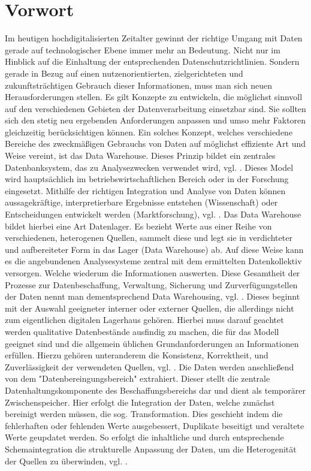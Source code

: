 \section{Vorwort}
Im heutigen hochdigitalisierten Zeitalter gewinnt der richtige Umgang mit Daten gerade auf technologischer Ebene immer mehr an Bedeutung. Nicht nur im Hinblick auf die Einhaltung der entsprechenden Datenschutzrichtlinien. Sondern gerade in Bezug auf einen nutzenorientierten, zielgerichteten und zukunftsträchtigen Gebrauch dieser Informationen, muss man sich neuen Herausforderungen stellen. Es gilt Konzepte zu entwickeln, die möglichst sinnvoll auf den verschiedenen Gebieten der Datenverarbeitung einsetzbar sind. Sie sollten sich den stetig neu ergebenden Anforderungen anpassen und umso mehr Faktoren gleichzeitig berücksichtigen können. Ein solches Konzept, welches verschiedene Bereiche des zweckmäßigen Gebrauchs von Daten auf möglichst effiziente Art und Weise vereint, ist das Data Warehouse. Dieses Prinzip bildet ein zentrales Datenbanksystem, das zu Analysezwecken verwendet wird, vgl. \cite{dtw}.
Dieses Model wird hauptsächlich im betriebswirtschaftlichen Bereich oder in der Forschung eingesetzt.  Mithilfe der richtigen Integration und Analyse von Daten können aussagekräftige, interpretierbare Ergebnisse entstehen (Wissenschaft) oder Entscheidungen entwickelt werden (Marktforschung), vgl. \cite{vorlesung}. 
Das Data Warehouse bildet hierbei eine Art Datenlager. Es bezieht Werte aus einer Reihe von verschiedenen, heterogenen Quellen, sammelt diese und legt sie in verdichteter und aufbereiteter Form in das Lager (Data Warehouse) ab. Auf diese Weise kann es die angebundenen Analysesysteme zentral mit dem ermittelten Datenkollektiv versorgen. Welche wiederum die Informationen auswerten.  Diese Gesamtheit der Prozesse zur Datenbeschaffung, Verwaltung, Sicherung und Zurverfügungstellen der Daten nennt man dementsprechend Data Warehousing, vgl. \cite{dtw}. 
Dieses beginnt mit der Auswahl geeigneter interner oder externer Quellen, die allerdings nicht zum eigentlichen digitalen Lagerhaus gehören. Hierbei muss darauf geachtet werden qualitative Datenbestände ausfindig zu machen, die für das Modell geeignet sind und die allgemein üblichen Grundanforderungen an Informationen erfüllen. Hierzu gehören unteranderem die Konsistenz, Korrektheit, und Zuverlässigkeit der verwendeten Quellen, vgl. \cite{vorlesung}. 
Die Daten werden anschließend von dem "Datenbereingungsbereich" extrahiert. Dieser stellt die zentrale Datenhaltungskomponente des Beschaffungsbereichs dar und dient als temporärer Zwischenspeicher. Hier erfolgt die Integration der Daten, welche zunächst bereinigt werden müssen, die sog. Transformation. Dies geschieht indem die fehlerhaften oder fehlenden Werte ausgebessert, Duplikate beseitigt und veraltete Werte geupdatet werden. So erfolgt die inhaltliche und durch entsprechende Schemaintegration die strukturelle Anpassung der Daten, um die Heterogenität der Quellen zu überwinden, vgl. \cite{vorlesung}.  
